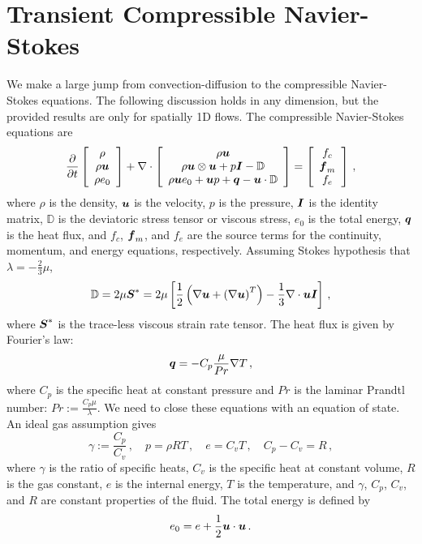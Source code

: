 \documentclass[Proposal.tex]{subfiles}
\begin{document}
\section{Transient Compressible Navier-Stokes}
We make a large jump from convection-diffusion to the compressible Navier-Stokes equations.
The following discussion holds in any dimension, but the provided results are only for spatially 1D flows.
The compressible Navier-Stokes equations are
\begin{align}
\frac{\partial}{\partial t}\left[ \begin{array}{c} \rho\\ \rho\boldsymbol u\\ \rho e_0\\ \end{array} \right]
+\nabla\cdot\left[ \begin{array}{c} \rho\boldsymbol u\\ \rho\boldsymbol u\otimes\boldsymbol u+p\boldsymbol I-\mathbb{D}\\ \rho\boldsymbol u e_0+\boldsymbol u p+\boldsymbol q-\boldsymbol u\cdot\mathbb{D}\\ \end{array} \right]
=\left[ \begin{array}{c} f_c\\ \boldsymbol f_m\\ f_e\\ \end{array} \right]\,,
\end{align}
where $\rho$ is the density, $\boldsymbol u$ is the velocity, $p$ is the pressure, $\boldsymbol I$ is the identity matrix,
$\mathbb{D}$ is the deviatoric stress tensor or viscous stress, $e_0$ is the total energy, $\boldsymbol q$ is the heat flux, 
and $f_c$, $\boldsymbol f_m$, and $f_e$ are the source terms for the continuity, momentum, and energy equations, respectively.
Assuming Stokes hypothesis that $\lambda=-\frac{2}{3}\mu$, 
\begin{equation*}
	\mathbb{D}=2\mu\boldsymbol S^*=2\mu\left[ \frac{1}{2}\left( \nabla\boldsymbol u+\left( \nabla\boldsymbol u \right)^T \right)-\frac{1}{3}\nabla\cdot\boldsymbol u\boldsymbol I \right]\,,
\end{equation*}
where $\boldsymbol S^*$ is the trace-less viscous strain rate tensor.
The heat flux is given by Fourier's law:
\begin{equation*}
	\boldsymbol q=-C_p\frac{\mu}{Pr}\nabla T\,,
\end{equation*}
where $C_p$ is the specific heat at constant pressure and $Pr$ is the laminar Prandtl number: $Pr:=\frac{C_p\mu}{\lambda}$.
We need to close these equations with an equation of state. An ideal gas assumption gives
\begin{equation*}
	\gamma:=\frac{C_p}{C_v}\,,\quad p=\rho RT\,,\quad e=C_v T\,,\quad C_p-C_v=R\,,
\end{equation*}
where $\gamma$ is the ratio of specific heats, $C_v$ is the specific heat at constant volume, $R$ is the gas constant,
$e$ is the internal energy, $T$ is the temperature,
and $\gamma$, $C_p$, $C_v$, and $R$ are constant properties of the fluid.
The total energy is defined by
\begin{equation*}
	e_0=e+\frac{1}{2}\boldsymbol u\cdot\boldsymbol u\,.
\end{equation*}
\end{document}
